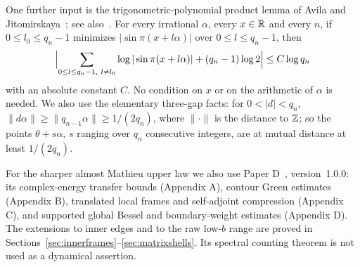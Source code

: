 One further input is the trigonometric-polynomial product lemma of Avila and Jitomirskaya~\cite[Lemma~9.7]{AJ2009}; see also~\cite[Lemma~B.1]{JL2018}. For every irrational $\alpha$, every $x\in\mathbb R$ and every $n$, if $0\le l_0\le q_n-1$ minimizes $|\sin\pi(x+l\alpha)|$ over $0\le l\le q_n-1$, then
\begin{equation}\label{eq:AJ}
\Bigl|\sum_{0\le l\le q_n-1,\ l\ne l_0}\log|\sin\pi(x+l\alpha)|+(q_n-1)\log2\Bigr|\le C\log q_n
\end{equation}
with an absolute constant $C$. No condition on $x$ or on the arithmetic of $\alpha$ is needed. We also use the elementary three-gap facts: for $0<|d|<q_n$, $\|d\alpha\|\ge\|q_{n-1}\alpha\|\ge1/(2q_n)$, where $\|\cdot\|$ is the distance to $\mathbb Z$; so the points $\theta+s\alpha$, $s$ ranging over $q_n$ consecutive integers, are at mutual distance at least $1/(2q_n)$.

For the sharper almost Mathieu upper law we also use Paper D~\cite{DMband}, version~1.0.0: its complex-energy transfer bounds (Appendix A), contour Green estimates (Appendix B), translated local frames and self-adjoint compression (Appendix C), and supported global Bessel and boundary-weight estimates (Appendix D). The extensions to inner edges and to the raw low-$b$ range are proved in Sections~\ref{sec:innerframes}--\ref{sec:matrixshells}. Its spectral counting theorem is not used as a dynamical assertion.
